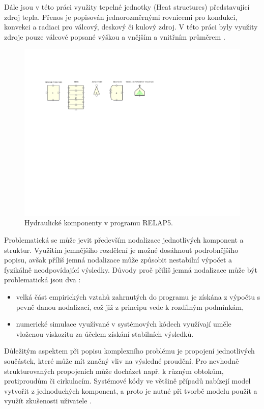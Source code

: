 Dále jsou v této práci využity tepelné jednotky (Heat structures) představující zdroj tepla. Přenos je popisován jednorozměrnými rovnicemi pro kondukci, konvekci a radiaci pro válcový, deskový či kulový zdroj. V této práci byly využity zdroje pouze válcové popsané výškou a vnějším a vnitřním průměrem \cite{relap_manual}.
\begin{figure}[H]
	\centering
	\includegraphics[clip, trim = 2cm 18cm 10cm 5cm, width=1.2\textwidth]{./03_benchmark/obrazky/HydraulicComponentsRELAPFinal.pdf}
	\caption{Hydraulické komponenty v programu RELAP5.}
	\label{fig:components_relap}
\end{figure}
Problematická se může jevit především nodalizace jednotlivých komponent a struktur. Využitím jemnějšího rozdělení je možné dosáhnout podrobnějšího popisu, avšak příliš jemná nodalizace může způsobit nestabilní výpočet a fyzikálně neodpovídající výsledky. Důvody proč příliš jemná nodalizace může být problematická jsou dva \cite{petruzzi2008thermal}:
\begin{itemize}
	\item velká část empirických vztahů zahrnutých do programu je získána z výpočtu s pevně danou nodalizací, což již z principu vede k rozdílným podmínkám,
	\item numerické simulace využívané v systémových kódech využívají uměle vloženou viskozitu za účelem získání stabilních výsledků.
\end{itemize}
Důležitým aspektem při popisu komplexního problému je propojení jednotlivých součástek, které může mít značný vliv na výsledné proudění. Pro nevhodně strukturovaných propojeních může docházet např. k různým obtokům, protiproudům či cirkulacím. Systémové kódy ve většině případů nabízejí model vytvořit z jednoduchých komponent, a proto je nutné při tvorbě modelu použít  a využít zkušenosti uživatele \cite{petruzzi2008thermal}. 

